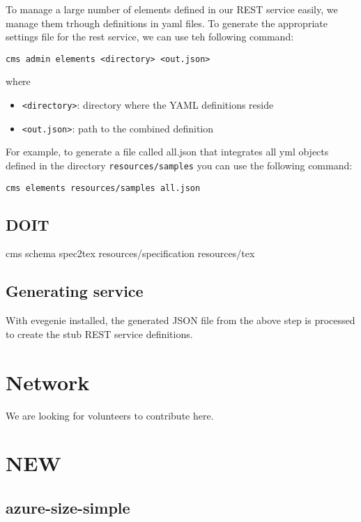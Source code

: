 \documentclass[9pt,twocolumn,twoside]{styles/osajnl}
\begin{document}
To manage a large number of elements defined in our REST service
easily, we manage them trhough definitions in yaml files. To generate
the appropriate settings file for the rest service, we can use teh
following command:

\begin{verbatim}
cms admin elements <directory> <out.json>
\end{verbatim}

where

\begin{itemize}
\item \verb+<directory>+: directory where the YAML definitions reside
\item \verb+<out.json>+: path to the combined definition
\end{itemize}

For example, to generate a file called all.json that integrates all
yml objects defined in the directory \verb+resources/samples+ you can
use the following command:

\begin{verbatim}
cms elements resources/samples all.json
\end{verbatim}

\subsection{DOIT}


cms schema spec2tex resources/specification resources/tex

\subsection{Generating service}

With evegenie installed, the generated JSON file from the above step
is processed to create the stub REST service definitions.


\section{Network}

We are looking for volunteers to contribute here.

\section{NEW}

\subsection{azure-size-simple}
\end{document}
